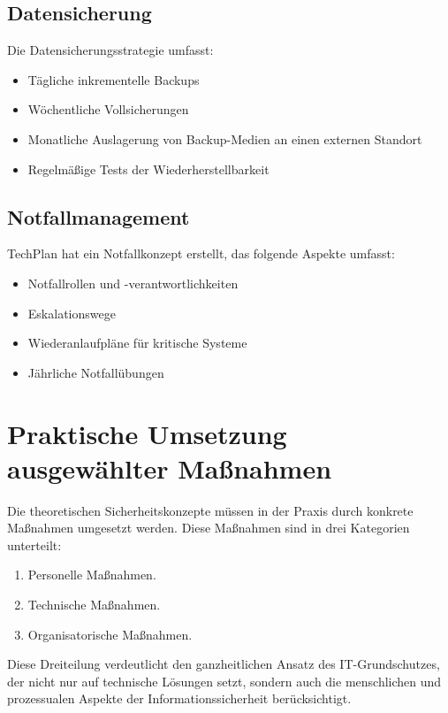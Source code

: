 \documentclass{orgstandard}
\begin{document}
\subsection{Datensicherung}
\label{sec:org0613bfe}

Die Datensicherungsstrategie umfasst:
\begin{itemize}
\item Tägliche inkrementelle Backups
\item Wöchentliche Vollsicherungen
\item Monatliche Auslagerung von Backup-Medien an einen externen Standort
\item Regelmäßige Tests der Wiederherstellbarkeit
\end{itemize}
\subsection{Notfallmanagement}
\label{sec:org572c7a9}

TechPlan hat ein Notfallkonzept erstellt, das folgende Aspekte umfasst:
\begin{itemize}
\item Notfallrollen und -verantwortlichkeiten
\item Eskalationswege
\item Wiederanlaufpläne für kritische Systeme
\item Jährliche Notfallübungen
\end{itemize}
\section{Praktische Umsetzung ausgewählter Maßnahmen}
\label{sec:org596ad7c}

Die theoretischen Sicherheitskonzepte müssen in der Praxis durch konkrete Maßnahmen umgesetzt werden. Diese Maßnahmen sind in drei Kategorien unterteilt:
\begin{enumerate}
\item Personelle Maßnahmen.
\item Technische Maßnahmen.
\item Organisatorische Maßnahmen.
\end{enumerate}

\begin{NOTES}
Diese Dreiteilung verdeutlicht den ganzheitlichen Ansatz des IT-Grundschutzes, der nicht nur auf technische Lösungen setzt, sondern auch die menschlichen und prozessualen Aspekte der Informationssicherheit berücksichtigt. 
\end{NOTES}
\end{document}
